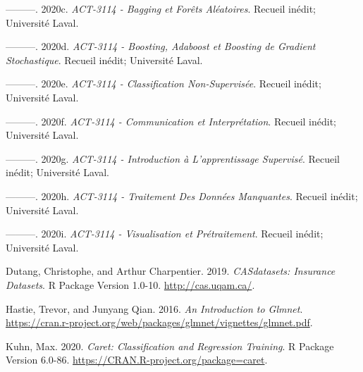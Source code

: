 \documentclass[]{article}
\begin{document}
\hypertarget{ref-baggingEtForet}{}
---------. 2020c. \emph{ACT-3114 - Bagging et Forêts Aléatoires}.
Recueil inédit; Université Laval.

\hypertarget{ref-Boosting}{}
---------. 2020d. \emph{ACT-3114 - Boosting, Adaboost et Boosting de
Gradient Stochastique}. Recueil inédit; Université Laval.

\hypertarget{ref-ClassificationNonSupervisuxe9e}{}
---------. 2020e. \emph{ACT-3114 - Classification Non-Supervisée}.
Recueil inédit; Université Laval.

\hypertarget{ref-Communication}{}
---------. 2020f. \emph{ACT-3114 - Communication et Interprétation}.
Recueil inédit; Université Laval.

\hypertarget{ref-IntroAppSupervise}{}
---------. 2020g. \emph{ACT-3114 - Introduction à L'apprentissage
Supervisé}. Recueil inédit; Université Laval.

\hypertarget{ref-TraitementDonnesManquantes}{}
---------. 2020h. \emph{ACT-3114 - Traitement Des Données Manquantes}.
Recueil inédit; Université Laval.

\hypertarget{ref-VisualisationPretraitement}{}
---------. 2020i. \emph{ACT-3114 - Visualisation et Prétraitement}.
Recueil inédit; Université Laval.

\hypertarget{ref-CASdatasets}{}
Dutang, Christophe, and Arthur Charpentier. 2019. \emph{CASdatasets:
Insurance Datasets}. R Package Version 1.0-10.
\url{http://cas.uqam.ca/}.

\hypertarget{ref-glmnet.intro}{}
Hastie, Trevor, and Junyang Qian. 2016. \emph{An Introduction to
Glmnet}.
\url{https://cran.r-project.org/web/packages/glmnet/vignettes/glmnet.pdf}.

\hypertarget{ref-Caret}{}
Kuhn, Max. 2020. \emph{Caret: Classification and Regression Training}. R
Package Version 6.0-86. \url{https://CRAN.R-project.org/package=caret}.
\end{document}
